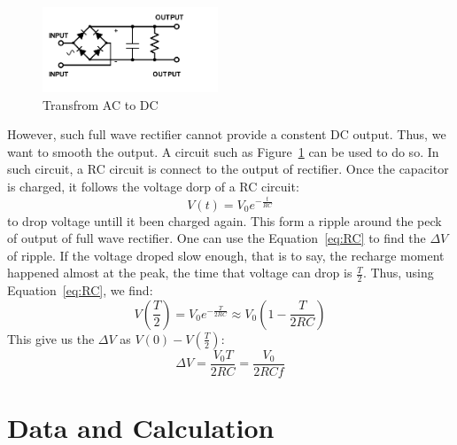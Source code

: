 \documentclass[aps,prl,reprint]{revtex4-1}
\begin{document}
    \begin{figure}[h]
        \centering
        \includegraphics[height=1in]{image/ACDC.pdf}
        \caption{Transfrom AC to DC}
        \label{fig:acdc}
    \end{figure}
    However, such full wave rectifier cannot provide a constent DC output. Thus, we want to smooth the output. A circuit such as Figure~\ref{fig:acdc} can be used to do so. In such circuit, a RC circuit is connect to the output of rectifier. Once the capacitor is charged, it follows the voltage dorp of a RC circuit:
    \begin{equation}
        V(t) = V_0e^{-\frac{t}{RC}} \label{eq:RC}
    \end{equation}
    to drop voltage untill it been charged again. This form a ripple around the peck of output of full wave rectifier. One can use the Equation~\ref{eq:RC} to find the $\Delta V$ of ripple. If the voltage droped slow enough, that is to say, the recharge moment happened almost at the peak, the time that voltage can drop is $\frac{T}{2}$. Thus, using Equation~\ref{eq:RC}, we find:
    \[
    V(\frac{T}{2}) = V_0e^{-\frac{T}{2RC}} \approx V_0 (1 - \frac{T}{2RC})
    \]
    This give us the $\Delta V$ as $V(0) - V(\frac{T}{2})$:
    \begin{equation}
        \Delta V = \frac{V_0 T}{2RC} = \frac{V_0 }{2RCf} \label{eq:fullWaveRectifier}
    \end{equation}

\section{Data and Calculation}
\end{document}
